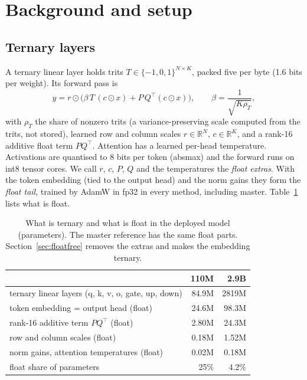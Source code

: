\documentclass[10pt,twocolumn]{article}
\newcommand{\R}{\mathbb{R}}
\begin{document}
\section{Background and setup}\label{sec:setup}

\subsection{Ternary layers}
A ternary linear layer holds trits $T\in\{-1,0,1\}^{N\times K}$, packed five per byte (1.6 bits per weight). Its forward
pass is
\begin{equation}
  y = r\odot\big(\beta\,T\,(c\odot x) + P\,Q^\top(c\odot x)\big), \qquad \beta = \frac{1}{\sqrt{K\rho_T}},
\end{equation}
with $\rho_T$ the share of nonzero trits (a variance-preserving scale computed from the trits, not stored), learned row
and column scales $r\in\R^N$, $c\in\R^K$, and a rank-16 additive float term $PQ^\top$. Attention has a learned per-head
temperature. Activations are quantised to 8 bits per token (absmax) and the forward runs on int8 tensor cores. We call
$r$, $c$, $P$, $Q$ and the temperatures the \emph{float extras}. With the token embedding (tied to the output head) and the
norm gains they form the \emph{float tail}, trained by AdamW in fp32 in every method, including master.
Table~\ref{tab:floats} lists what is float.

\begin{table}[t]
\centering
\caption{What is ternary and what is float in the deployed model (parameters). The master reference has the same float
parts. Section~\ref{sec:floatfree} removes the extras and makes the embedding ternary.}
\label{tab:floats}
\begin{tabular}{lrr}
\toprule
 & 110M & 2.9B \\
\midrule
ternary linear layers (q, k, v, o, gate, up, down) & 84.9M & 2819M \\
token embedding = output head (float) & 24.6M & 98.3M \\
rank-16 additive term $PQ^\top$ (float) & 2.80M & 24.3M \\
row and column scales (float) & 0.18M & 1.52M \\
norm gains, attention temperatures (float) & 0.02M & 0.18M \\
\midrule
float share of parameters & 25\% & 4.2\% \\
\bottomrule
\end{tabular}
\end{table}
\end{document}
